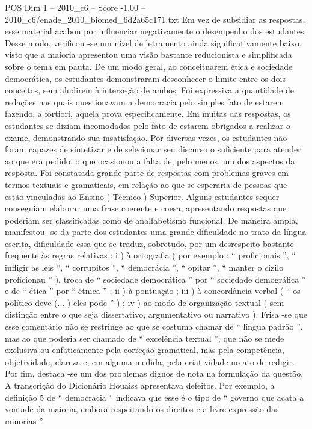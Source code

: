 \begin{textsample}{POS Dim 1 – 2010\_c6 – Score -1.00 – 2010\_c6/enade\_2010\_biomed\_6d2a65c171.txt}
Em vez de subsidiar as respostas, esse material acabou por influenciar negativamente o desempenho dos estudantes.
Desse modo, verificou -se um nível de letramento ainda significativamente baixo, visto que a maioria apresentou uma visão bastante reducionista e simplificada sobre o tema em pauta.
De um modo geral, ao conceituarem ética e sociedade democrática, os estudantes demonstraram desconhecer o limite entre os dois conceitos, sem aludirem à interseção de ambos.
Foi expressiva a quantidade de redações nas quais questionavam a democracia pelo simples fato de estarem fazendo, a fortiori, aquela prova especificamente.
Em muitas das respostas, os estudantes se diziam incomodados pelo fato de estarem obrigados a realizar o exame, demonstrando sua insatisfação.
Por diversas vezes, os estudantes não foram capazes de sintetizar e de selecionar seu discurso o suficiente para atender ao que era pedido, o que ocasionou a falta de, pelo menos, um dos aspectos da resposta.
Foi constatada grande parte de respostas com problemas graves em termos textuais e gramaticais, em relação ao que se esperaria de pessoas que estão vinculadas ao Ensino ( Técnico ) Superior.
Alguns estudantes sequer conseguiam elaborar uma frase coerente e coesa, apresentando respostas que poderiam ser classificadas como de analfabetismo funcional.
De maneira ampla, manifestou -se da parte dos estudantes uma grande dificuldade no trato da língua escrita, dificuldade essa que se traduz, sobretudo, por um desrespeito bastante frequente às regras relativas : i ) à ortografia ( por exemplo : “ proficionais ”, “ infligir as leis ”, “ corrupitos ”, “ democrácia ”, “ opitar ”, “ manter o cizilo proficionau ” ), troca de “ sociedade democrática ” por “ sociedade demográfica ” e de “ ética ” por “ étnica ” ; ii ) à pontuação ; iii ) à concordância verbal ( “ os político deve (... ) eles pode ” ) ; iv ) ao modo de organização textual ( sem distinção entre o que seja dissertativo, argumentativo ou narrativo ).
Frisa -se que esse comentário não se restringe ao que se costuma chamar de “ língua padrão ”, mas ao que poderia ser chamado de “ excelência textual ”, que não se mede exclusiva ou enfaticamente pela correção gramatical, mas pela competência, objetividade, clareza e, em alguma medida, pela criatividade no ato de redigir.
Por fim, destaca -se um dos problemas dignos de nota na formulação da questão.
A transcrição do Dicionário Houaiss apresentava defeitos.
Por exemplo, a definição 5 de “ democracia ” indicava que esse é o tipo de “ governo que acata a vontade da maioria, embora respeitando os direitos e a livre expressão das minorias ”.

\end{textsample}
